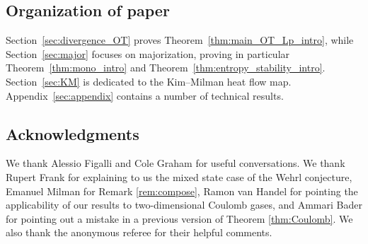 \documentclass[10pt]{amsart}
\theoremstyle{definition}\newtheorem{defi}[theo]{Definition}\newtheorem{rema}[theo]{Remark}\newtheorem{exam}[theo]{Example}\newtheorem{exem}[theo]{Example}\newtheorem{nota}[theo]{Notation}
\begin{document}
\subsection*{Organization of paper}

Section~\ref{sec:divergence_OT} proves Theorem~\ref{thm:main_OT_Lp_intro}, while Section~\ref{sec:major} focuses on majorization, proving in particular Theorem~\ref{thm:mono_intro} and Theorem~\ref{thm:entropy_stability_intro}. Section~\ref{sec:KM} is dedicated to the Kim--Milman  heat flow map. Appendix~\ref{sec:appendix} contains a number of technical results.

\subsection*{Acknowledgments}
We thank Alessio Figalli and Cole Graham for useful conversations. We thank Rupert Frank for explaining to us the mixed state case of the Wehrl conjecture, Emanuel Milman for Remark \ref{rem:compose}, Ramon van Handel for pointing the applicability of our results to two-dimensional Coulomb gases, and Ammari Bader for pointing out a mistake in a previous version of Theorem \ref{thm:Coulomb}. We also thank the anonymous referee for their helpful comments.  
\end{document}
